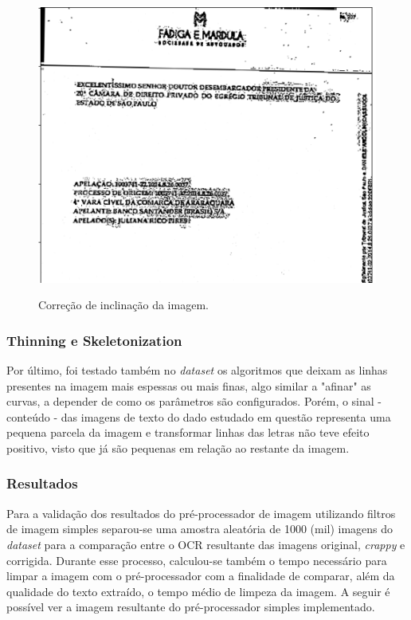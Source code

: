 \begin{figure}[H]
  \centering
  \caption{Correção de inclinação da imagem.}
  \includegraphics[scale=.7]{figuras/skew-corrected-image.png}
  \label{fig:skew-corrected-image}
\end{figure}


\subsubsection{Thinning e Skeletonization}

Por último, foi testado também no \textit{dataset} os algoritmos que deixam as linhas presentes na imagem mais espessas ou mais finas, algo similar a "afinar" as curvas, a depender de como os parâmetros são configurados. Porém, o sinal - conteúdo - das imagens de texto do dado estudado em questão representa uma pequena parcela da imagem e transformar linhas das letras não teve efeito positivo, visto que já são pequenas em relação ao restante da imagem.

\subsubsection{Resultados}

Para a validação dos resultados do pré-processador de imagem utilizando filtros de imagem simples separou-se uma amostra aleatória de 1000 (mil) imagens do \textit{dataset} para a comparação entre o OCR resultante das imagens original, \textit{crappy} e corrigida. Durante esse processo, calculou-se também o tempo necessário para limpar a imagem com o pré-processador com a finalidade de comparar, além da qualidade do texto extraído, o tempo médio de limpeza da imagem. A seguir é possível ver a imagem resultante do pré-processador simples implementado.

